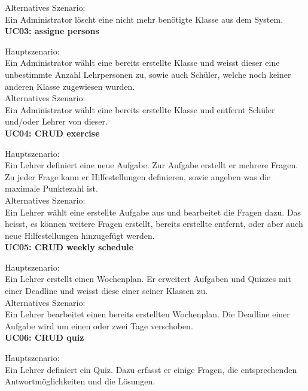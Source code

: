 \noindent Alternatives Szenario: \\
Ein Administrator löscht eine nicht mehr benötigte Klasse aus dem System. \\


\noindent \textbf{UC03: assigne persons}

\noindent Hauptszenario: \\
Ein Administrator wählt eine bereits erstellte Klasse und weisst dieser eine unbestimmte Anzahl Lehrpersonen zu, sowie auch Schüler, welche noch keiner anderen Klasse zugewiesen wurden. \\

\noindent Alternatives Szenario: \\
Ein Administrator wählt eine bereits erstellte Klasse und entfernt Schüler und/oder Lehrer von dieser. \\


\noindent \textbf{UC04: CRUD exercise}

\noindent Hauptszenario: \\
Ein Lehrer definiert eine neue Aufgabe. Zur Aufgabe erstellt er mehrere Fragen. Zu jeder Frage kann er Hilfestellungen definieren, sowie angeben was die maximale Punktezahl ist. \\

\noindent Alternatives Szenario: \\
Ein Lehrer wählt eine erstellte Aufgabe aus und bearbeitet die Fragen dazu. Das heisst, es können weitere Fragen erstellt, bereits erstellte entfernt, oder aber auch neue Hilfestellungen hinzugefügt werden. \\


\noindent \textbf{UC05: CRUD weekly schedule}

\noindent Hauptszenario: \\
Ein Lehrer erstellt einen Wochenplan. Er erweitert Aufgaben und Quizzes mit einer Deadline und weisst diese einer seiner Klassen zu. \\

\noindent Alternatives Szenario: \\
Ein Lehrer bearbeitet einen bereits erstellten Wochenplan. Die Deadline einer Aufgabe wird um einen oder zwei Tage verschoben. \\


\noindent \textbf{UC06: CRUD quiz}

\noindent Hauptszenario: \\
Ein Lehrer definiert ein Quiz. Dazu erfasst er einige Fragen, die entsprechenden Antwortmöglichkeiten und die Lösungen. \\


